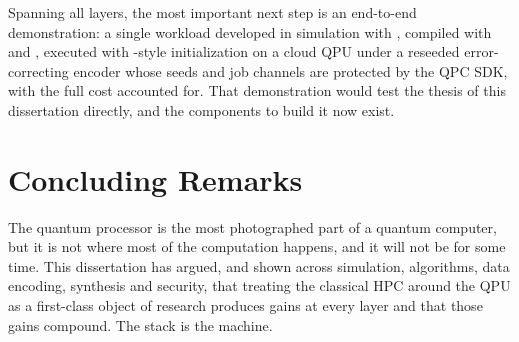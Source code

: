 Spanning all layers, the most important next step is an end-to-end demonstration: a single workload developed in simulation with \qgear, compiled with \shardq{} and \rubriq, executed with \deal-style initialization on a cloud QPU under a reseeded error-correcting encoder whose seeds and job channels are protected by the QPC SDK, with the full cost accounted for. That demonstration would test the thesis of this dissertation directly, and the components to build it now exist.

\section{Concluding Remarks}\label{sec:conclusion:remarks}

The quantum processor is the most photographed part of a quantum computer, but it is not where most of the computation happens, and it will not be for some time. This dissertation has argued, and shown across simulation, algorithms, data encoding, synthesis and security, that treating the classical HPC around the QPU as a first-class object of research produces gains at every layer and that those gains compound. The stack is the machine.

